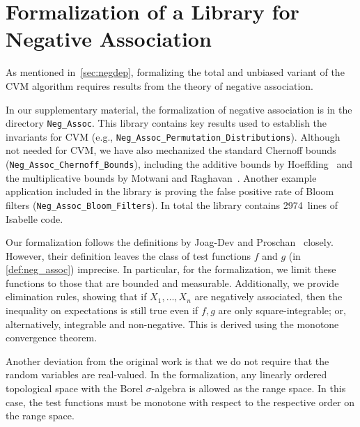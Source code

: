 \section{Formalization of a Library for Negative Association}\label{sec:formalization_neg_dep}
As mentioned in~\cref{sec:negdep}, formalizing the total and unbiased variant of the CVM algorithm requires results from the theory of negative association.

\begin{note}
In our supplementary material, the formalization of negative association is in the directory \verb|Neg_Assoc|.
This library contains key results used to establish the invariants for CVM (e.g., \verb|Neg_Assoc_Permutation_Distributions|).
Although not needed for CVM, we have also mechanized the standard Chernoff bounds (\verb|Neg_Assoc_Chernoff_Bounds|), including the additive bounds by Hoeffding~\cite[Th. 1, 2]{hoeffding1963} and the multiplicative bounds by Motwani and Raghavan~\cite[Th. 4.1, 4.2]{motwani1995}.
Another example application included in the library is proving the false positive rate of Bloom filters (\verb|Neg_Assoc_Bloom_Filters|).
In total the library contains 2974~lines of Isabelle code.
\lipicsEnd\end{note}

Our formalization follows the definitions by Joag-Dev and Proschan~\cite{joagdev1983} closely.
However, their definition leaves the class of test functions $f$ and $g$ (in \cref{def:neg_assoc}) imprecise.
In particular, for the formalization, we limit these functions to those that are bounded and measurable.
Additionally, we provide elimination rules, showing that if $X_1,\dots,X_n$ are negatively associated, then the inequality on expectations is still true even if $f, g$ are only square-integrable; or, alternatively, integrable and non-negative. This is derived using the monotone convergence theorem.

Another deviation from the original work is that we do not require that the random variables are real-valued.
In the formalization, any linearly ordered topological space with the Borel $\sigma$-algebra is allowed as the range space.
In this case, the test functions must be monotone with respect to the respective order on the range space.

